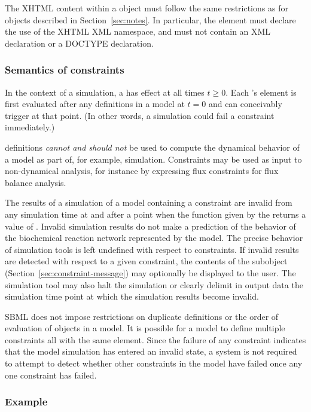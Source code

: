 The XHTML content within a \Message object must follow the same
restrictions as for \Notes objects described in
Section~\ref{sec:notes}.  In particular, the element must declare
the use of the XHTML XML namespace, and must not contain an XML
declaration or a DOCTYPE declaration.


\subsubsection{Semantics of constraints}
\label{sec:constraint-semantics}

In the context of a simulation, a \Constraint has effect at all
times $t \geq 0$.  Each \Constraint's  element is first
evaluated after any \InitialAssignment definitions in a model at
$t = 0$ and can conceivably trigger at that point.  (In other
words, a simulation could fail a constraint immediately.)

\Constraint definitions \emph{cannot and should not} be used to
compute the dynamical behavior of a model as part of, for example,
simulation.  Constraints may be used as input to non-dynamical
analysis, for instance by expressing flux constraints for flux
balance analysis.

The results of a simulation of a model containing a constraint are
invalid from any simulation time at and after a point when the
function given by the  returns a value of .
Invalid simulation results do not make a prediction of the
behavior of the biochemical reaction network represented by the
model.  The precise behavior of simulation tools is left undefined
with respect to constraints.  If invalid results are detected with
respect to a given constraint, the contents of the \Message
subobject (Section~\ref{sec:constraint-message}) may optionally be
displayed to the user.  The simulation tool may also halt the
simulation or clearly delimit in output data the simulation time
point at which the simulation results become invalid.

SBML does not impose restrictions on duplicate \Constraint
definitions or the order of evaluation of \Constraint objects in a
model.  It is possible for a model to define multiple constraints
all with the same  element.  Since the failure of any
constraint indicates that the model simulation has entered an
invalid state, a system is not required to attempt to detect
whether other constraints in the model have failed once any one
constraint has failed.


\subsubsection{Example}

